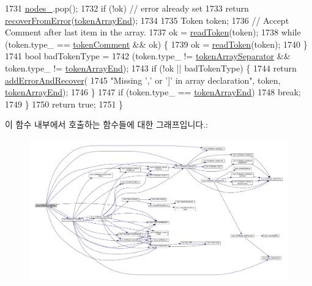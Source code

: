 \begin{DoxyCode}
1731     \hyperlink{class_json_1_1_our_reader_a19cc4e8c5d17ee6822f752e9a36f4ce3}{nodes\_}.pop();
1732     \textcolor{keywordflow}{if} (!ok) \textcolor{comment}{// error already set}
1733       \textcolor{keywordflow}{return} \hyperlink{class_json_1_1_our_reader_a035651f0700a76a815e5f904c63ebb1c}{recoverFromError}(\hyperlink{class_json_1_1_our_reader_a15116f7276ddf1e7a2cc3cbefa884dcca59a4f42b50d9731dce6be41818c3d91b}{tokenArrayEnd});
1734 
1735     Token token;
1736     \textcolor{comment}{// Accept Comment after last item in the array.}
1737     ok = \hyperlink{class_json_1_1_our_reader_a0d1e66da47fe2e85f5033c59326dfdc3}{readToken}(token);
1738     \textcolor{keywordflow}{while} (token.type\_ == \hyperlink{class_json_1_1_our_reader_a15116f7276ddf1e7a2cc3cbefa884dcca777fb6589fdbe225bc10a1e49a090da9}{tokenComment} && ok) \{
1739       ok = \hyperlink{class_json_1_1_our_reader_a0d1e66da47fe2e85f5033c59326dfdc3}{readToken}(token);
1740     \}
1741     \textcolor{keywordtype}{bool} badTokenType =
1742         (token.type\_ != \hyperlink{class_json_1_1_our_reader_a15116f7276ddf1e7a2cc3cbefa884dcca8ca62ab9091b149d52ec55828f8040f4}{tokenArraySeparator} && token.type\_ != 
      \hyperlink{class_json_1_1_our_reader_a15116f7276ddf1e7a2cc3cbefa884dcca59a4f42b50d9731dce6be41818c3d91b}{tokenArrayEnd});
1743     \textcolor{keywordflow}{if} (!ok || badTokenType) \{
1744       \textcolor{keywordflow}{return} \hyperlink{class_json_1_1_our_reader_a074cf3d91e9404fe89e03cfc6a43e6fb}{addErrorAndRecover}(
1745           \textcolor{stringliteral}{"Missing ',' or ']' in array declaration"}, token, \hyperlink{class_json_1_1_our_reader_a15116f7276ddf1e7a2cc3cbefa884dcca59a4f42b50d9731dce6be41818c3d91b}{tokenArrayEnd});
1746     \}
1747     \textcolor{keywordflow}{if} (token.type\_ == \hyperlink{class_json_1_1_our_reader_a15116f7276ddf1e7a2cc3cbefa884dcca59a4f42b50d9731dce6be41818c3d91b}{tokenArrayEnd})
1748       \textcolor{keywordflow}{break};
1749   \}
1750   \textcolor{keywordflow}{return} \textcolor{keyword}{true};
1751 \}
\end{DoxyCode}
이 함수 내부에서 호출하는 함수들에 대한 그래프입니다.\+:\nopagebreak
\begin{figure}[H]
\begin{center}
\leavevmode
\includegraphics[width=350pt]{class_json_1_1_our_reader_a0b9f58faf4212c6ecb5d8e2a1ac10257_cgraph}
\end{center}
\end{figure}
